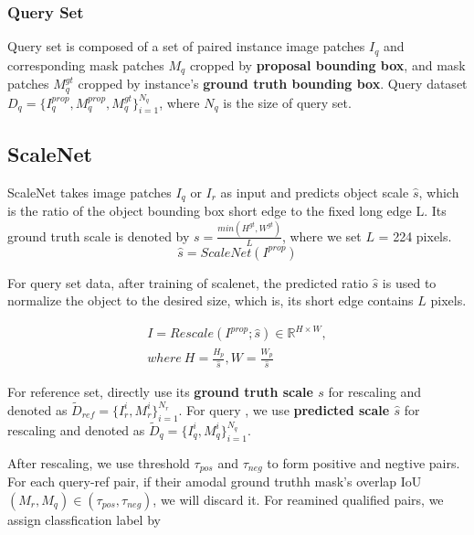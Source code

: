 \documentclass[10pt,twocolumn,letterpaper]{article}
\begin{document}
\subsubsection{Query Set}

Query set is composed of a set of paired instance image patches $I_q $ and corresponding mask patches $M_q$
cropped by {\bf proposal bounding box}, and mask patches $M_q^{gt}$ cropped by instance's {\bf ground truth bounding box}. Query dataset
$D_{q} = \{I_q^{prop}, M_q^{prop}, M_q^{gt}\}^{N_q}_{i=1}$, where $N_q$ is the size of query set.

\subsection{ScaleNet}
ScaleNet takes image patches $I_q$ or $I_r$ as input and predicts object scale $\hat{s}$, which is the 
ratio of the object bounding box short edge to the fixed long edge L. Its ground truth scale is denoted by $ s = \frac{min(H^{gt}, W^{gt})}{L}$,
where we set $L$ = 224 pixels.
   \begin{equation}
      \hat{s} = ScaleNet(I^{prop})
   \end{equation}


For query set data, after training of scalenet, the predicted ratio $\hat{s}$ is used to normalize the object to the desired size, which is, its short edge contains $L$ pixels.

   \begin{equation}
      \begin{split}
          I = Rescale(I^{prop};\hat{s})\in  {\mathbb{R}^{H\times W} },\\
          where \ H = \frac{H_p}{\hat{s}},  W = \frac{W_p}{\hat{s}} 
      \end{split}
   \end{equation}
   
   
For reference set, directly use its {\bf ground truth scale $s$ }for rescaling and denoted as $\tilde{D}_{ref} = \{I^i_r, M^i_r\}^{N_r}_{i=1}$.
 For query , we use {\bf predicted scale $\hat{s}$} for rescaling and denoted as $\tilde{D}_{q} = \{I^i_q, M^i_q\}^{N_q}_{i=1}$. 

After rescaling, we use threshold $\tau _{pos}$ and $\tau _{neg}$ to form positive and negtive pairs. For each query-ref pair, 
if their amodal ground truthh mask's overlap IoU$(M_r, M_q) \in (\tau_{pos},\tau_{neg})$, we will discard it. For reamined qualified
pairs, we assign classfication label by 
\end{document}

